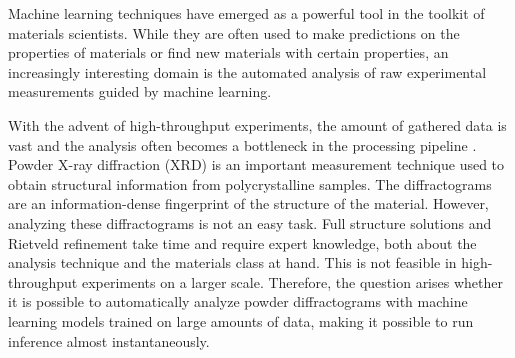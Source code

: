 








Machine learning techniques have emerged as a powerful tool in the toolkit of
materials scientists. While they are often used to make predictions on
the properties of materials or find new materials with certain properties, an increasingly interesting domain is the automated analysis of raw experimental measurements
guided by machine learning\supercite{radovicMachineLearningEnergy2018}.

With the advent of high-throughput experiments, the amount of gathered data is
vast and the analysis often becomes a bottleneck in the processing pipeline
\supercite{rahmanianEnablingModularAutonomous2022}. Powder X-ray diffraction
(XRD) is an important measurement technique used to obtain structural
information from polycrystalline samples\supercite{harrisContemporaryAdvancesUse2001}. 
The diffractograms are an
information-dense fingerprint of the structure of the material. However,
analyzing these diffractograms is not an easy task\supercite{holderTutorialPowderXray2019}. 
Full structure solutions and
Rietveld refinement take time and require expert knowledge, both about the
analysis technique and the materials class at hand. This is not feasible in high-throughput experiments on a larger
scale. Therefore, the question arises whether it is possible to automatically 
analyze powder diffractograms with machine learning models trained on large
amounts of data, making it possible to run inference almost instantaneously.

